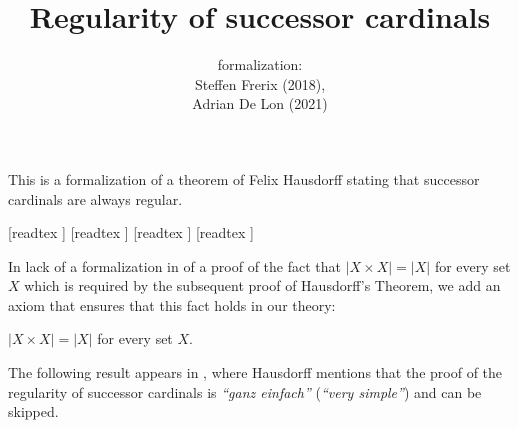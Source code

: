 \documentclass{article}
\title{Regularity of successor cardinals}
\author{\Naproche formalization:\\[0.5em]
Steffen Frerix (2018), \\
Adrian De Lon (2021)}
\date{}
\begin{document}
  \maketitle

  \noindent This is a formalization of a theorem of Felix Hausdorff stating that
  successor cardinals are always regular.

  \begin{imports}
    \begin{forthel}
      [readtex ]
      [readtex ]
      [readtex ]
      [readtex ]
    \end{forthel}
  \end{imports}

  In lack of a formalization in \Naproche of a proof of the fact that
  $|X \times X| = |X|$ for every set $X$ which is required by the subsequent
  proof of Hausdorff's Theorem, we add an axiom that ensures that this fact
  holds in our theory:

  \begin{forthel}
    \begin{axiom*}
      $|X \times X| = |X|$ for every set $X$.
    \end{axiom*}
  \end{forthel}

  The following result appears in \cite[p.~443]{Hausdorff1908},
  where Hausdorff mentions that the proof of the regularity of successor
  cardinals is \textit{``ganz einfach''} (\textit{``very simple''})
  and can be skipped.
\end{document}
